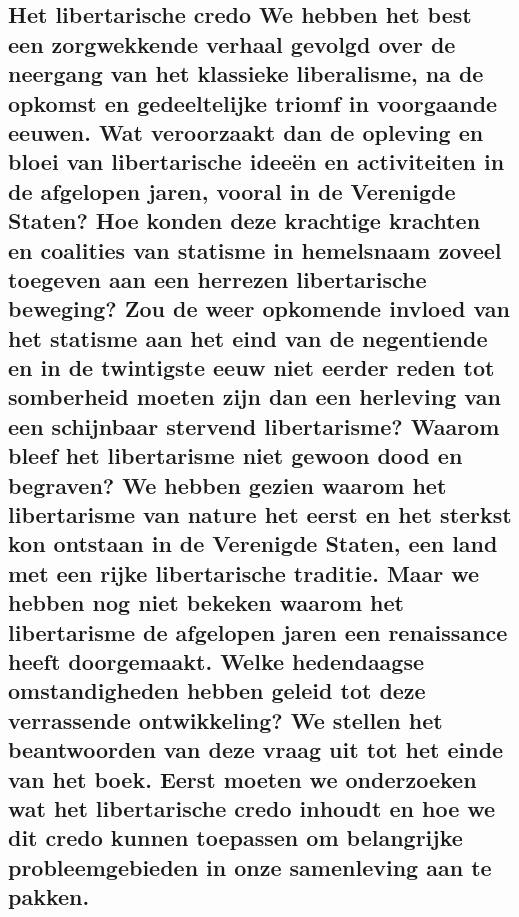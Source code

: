 \documentclass[
  a5paper,
  smalldemyvopaper,10pt,twoside,onecolumn,openright,extrafontsizes,hidelinks]{memoir}
\begin{document}
\subsection{Het libertarische credo We hebben het best een zorgwekkende
verhaal gevolgd over de neergang van het klassieke liberalisme, na de
opkomst en gedeeltelijke triomf in voorgaande eeuwen. Wat veroorzaakt
dan de opleving en bloei van libertarische ideeën en activiteiten in de
afgelopen jaren, vooral in de Verenigde Staten? Hoe konden deze
krachtige krachten en coalities van statisme in hemelsnaam zoveel
toegeven aan een herrezen libertarische beweging? Zou de weer opkomende
invloed van het statisme aan het eind van de negentiende en in de
twintigste eeuw niet eerder reden tot somberheid moeten zijn dan een
herleving van een schijnbaar stervend libertarisme? Waarom bleef het
libertarisme niet gewoon dood en begraven? We hebben gezien waarom het
libertarisme van nature het eerst en het sterkst kon ontstaan in de
Verenigde Staten, een land met een rijke libertarische traditie. Maar we
hebben nog niet bekeken waarom het libertarisme de afgelopen jaren een
renaissance heeft doorgemaakt. Welke hedendaagse omstandigheden hebben
geleid tot deze verrassende ontwikkeling? We stellen het beantwoorden
van deze vraag uit tot het einde van het boek. Eerst moeten we
onderzoeken wat het libertarische credo inhoudt en hoe we dit credo
kunnen toepassen om belangrijke probleemgebieden in onze samenleving aan
te
pakken.}\label{het-libertarische-credo-we-hebben-het-best-een-zorgwekkende-verhaal-gevolgd-over-de-neergang-van-het-klassieke-liberalisme-na-de-opkomst-en-gedeeltelijke-triomf-in-voorgaande-eeuwen.-wat-veroorzaakt-dan-de-opleving-en-bloei-van-libertarische-ideeuxebn-en-activiteiten-in-de-afgelopen-jaren-vooral-in-de-verenigde-staten-hoe-konden-deze-krachtige-krachten-en-coalities-van-statisme-in-hemelsnaam-zoveel-toegeven-aan-een-herrezen-libertarische-beweging-zou-de-weer-opkomende-invloed-van-het-statisme-aan-het-eind-van-de-negentiende-en-in-de-twintigste-eeuw-niet-eerder-reden-tot-somberheid-moeten-zijn-dan-een-herleving-van-een-schijnbaar-stervend-libertarisme-waarom-bleef-het-libertarisme-niet-gewoon-dood-en-begraven-we-hebben-gezien-waarom-het-libertarisme-van-nature-het-eerst-en-het-sterkst-kon-ontstaan-in-de-verenigde-staten-een-land-met-een-rijke-libertarische-traditie.-maar-we-hebben-nog-niet-bekeken-waarom-het-libertarisme-de-afgelopen-jaren-een-renaissance-heeft-doorgemaakt.-welke-hedendaagse-omstandigheden-hebben-geleid-tot-deze-verrassende-ontwikkeling-we-stellen-het-beantwoorden-van-deze-vraag-uit-tot-het-einde-van-het-boek.-eerst-moeten-we-onderzoeken-wat-het-libertarische-credo-inhoudt-en-hoe-we-dit-credo-kunnen-toepassen-om-belangrijke-probleemgebieden-in-onze-samenleving-aan-te-pakken.}
\end{document}
